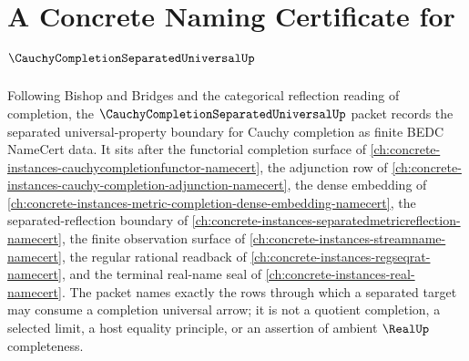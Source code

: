 \chapter{A Concrete Naming Certificate for $\CauchyCompletionSeparatedUniversalUp$}
\label{ch:concrete-instances-cauchy-completion-separated-universal-namecert}

Following Bishop and Bridges and the categorical reflection reading of completion, the $\CauchyCompletionSeparatedUniversalUp$ packet records the separated universal-property boundary for Cauchy completion as finite BEDC NameCert data. It sits after the functorial completion surface of \autoref{ch:concrete-instances-cauchycompletionfunctor-namecert}, the adjunction row of \autoref{ch:concrete-instances-cauchy-completion-adjunction-namecert}, the dense embedding of \autoref{ch:concrete-instances-metric-completion-dense-embedding-namecert}, the separated-reflection boundary of \autoref{ch:concrete-instances-separatedmetricreflection-namecert}, the finite observation surface of \autoref{ch:concrete-instances-streamname-namecert}, the regular rational readback of \autoref{ch:concrete-instances-regseqrat-namecert}, and the terminal real-name seal of \autoref{ch:concrete-instances-real-namecert}. The packet names exactly the rows through which a separated target may consume a completion universal arrow; it is not a quotient completion, a selected limit, a host equality principle, or an assertion of ambient $\RealUp$ completeness.

